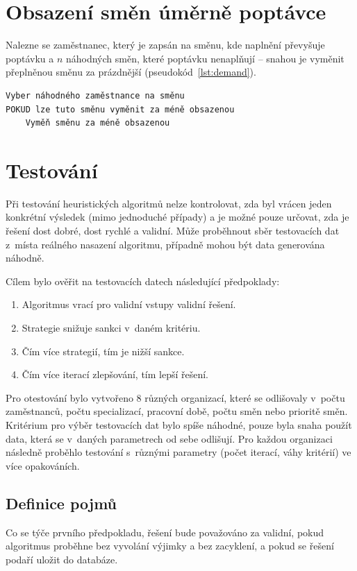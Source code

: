 \documentclass[twoside]{ctuthesis}
\begin{document}
\section{Obsazení směn úměrně poptávce}
Nalezne se zaměstnanec, který je zapsán na směnu, kde naplnění převyšuje poptávku a $n$ náhodných směn, které poptávku nenaplňují – snahou je vyměnit přeplněnou směnu za prázdnější (pseudokód~\ref{lst:demand}).

\begin{lstlisting}[caption={Strategie pro obsazení směn dle poptávky}, label={lst:demand}]
Vyber náhodného zaměstnance na směnu
POKUD lze tuto směnu vyměnit za méně obsazenou
	Vyměň směnu za méně obsazenou
\end{lstlisting}

\section{Testování}

Při testování heuristických algoritmů nelze kontrolovat, zda byl vrácen jeden konkrétní výsledek (mimo jednoduché případy) a je možné pouze určovat, zda je řešení dost dobré, dost rychlé a validní. Může proběhnout sběr testovacích dat z~místa reálného nasazení algoritmu, případně mohou být data generována náhodně. \cite{rardin2001experimental}

Cílem bylo ověřit na testovacích datech následující předpoklady:
\begin{enumerate}
	\item Algoritmus vrací pro validní vstupy validní řešení.
	\item Strategie snižuje sankci v~daném kritériu.
	\item Čím více strategií, tím je nižší sankce.
	\item Čím více iterací zlepšování, tím lepší řešení.
\end{enumerate}


Pro otestování bylo vytvořeno 8 různých organizací, které se odlišovaly v~počtu zaměstnanců, počtu specializací, pracovní době, počtu směn nebo prioritě směn. Kritérium pro výběr testovacích dat bylo spíše náhodné, pouze byla snaha použít data, která se v~daných parametrech od sebe odlišují. Pro každou organizaci následně proběhlo testování s~různými parametry (počet iterací, váhy kritérií) ve více opakováních.


\subsection{Definice pojmů}
Co se týče prvního předpokladu, řešení bude považováno za validní, pokud algoritmus proběhne bez vyvolání výjimky a bez zacyklení, a pokud se řešení podaří uložit do databáze.
\end{document}
